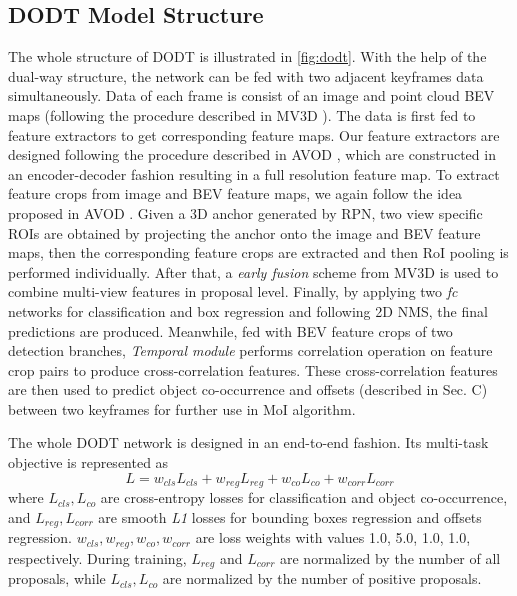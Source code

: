 \documentclass[letterpaper, 10pt, conference]{ieeeconf}  %
\begin{document}
\subsection{DODT Model Structure} 
The whole structure of DODT is illustrated in \figurename \ref{fig:dodt}. With the help of the dual-way structure, the network can be fed with two adjacent keyframes data simultaneously. Data of each frame is consist of an image and point cloud BEV maps (following the procedure described in MV3D \cite{chen2017multi}). The data is first fed to feature extractors to get corresponding feature maps. Our feature extractors are designed following the procedure described in AVOD \cite{ku2018joint}, which are constructed in an encoder-decoder fashion resulting in a full resolution feature map. To extract feature crops from image and BEV feature maps, we again follow the idea proposed in AVOD \cite{ku2018joint}. Given a 3D anchor generated by RPN, two view specific ROIs are obtained by projecting the anchor onto the image and BEV feature maps, then the corresponding feature crops are extracted and then RoI pooling is performed individually. After that, a \textit{early fusion} scheme from MV3D \cite{chen2017multi} is used to combine multi-view features in proposal level. Finally, by applying two \textit{fc} networks for classification and box regression and following 2D NMS, the final predictions are produced. Meanwhile, fed with BEV feature crops of two detection branches, \textit{Temporal module} performs correlation operation on feature crop pairs to produce cross-correlation features. These cross-correlation features are then used to predict object co-occurrence and offsets (described in Sec. C) between two keyframes for further use in MoI algorithm.

The whole DODT network is designed in an end-to-end fashion. Its multi-task objective is represented as
\begin{equation}
L = w_{cls}L_{cls} + w_{reg}L_{reg} + w_{co}L_{co} + w_{corr}L_{corr}
\end{equation}
where $L_{cls}, L_{co}$ are cross-entropy losses for classification and object co-occurrence, and $L_{reg}, L_{corr}$ are smooth \textit{L1} losses for bounding boxes regression and offsets regression. $w_{cls}, w_{reg}, w_{co}, w_{corr}$ are loss weights with values 1.0, 5.0, 1.0, 1.0, respectively. During training, $L_{reg}$ and $L_{corr}$ are normalized by the number of all proposals, while $L_{cls}, L_{co}$ are normalized by the number of positive proposals.
\end{document}
